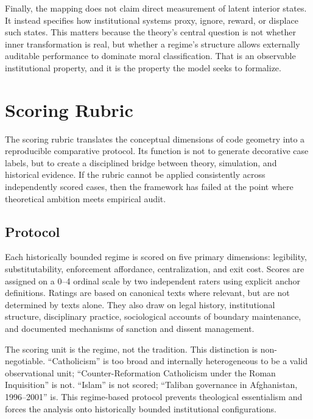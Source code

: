 \documentclass[12pt]{article}
\begin{document}
Finally, the mapping does not claim direct measurement of latent interior states. It instead specifies how institutional systems proxy, ignore, reward, or displace such states. This matters because the theory's central question is not whether inner transformation is real, but whether a regime's structure allows externally auditable performance to dominate moral classification. That is an observable institutional property, and it is the property the model seeks to formalize.



\section{Scoring Rubric}

The scoring rubric translates the conceptual dimensions of code geometry into a reproducible comparative protocol. Its function is not to generate decorative case labels, but to create a disciplined bridge between theory, simulation, and historical evidence. If the rubric cannot be applied consistently across independently scored cases, then the framework has failed at the point where theoretical ambition meets empirical audit.

\subsection{Protocol}

Each historically bounded regime is scored on five primary dimensions: legibility, substitutability, enforcement affordance, centralization, and exit cost. Scores are assigned on a 0--4 ordinal scale by two independent raters using explicit anchor definitions. Ratings are based on canonical texts where relevant, but are not determined by texts alone. They also draw on legal history, institutional structure, disciplinary practice, sociological accounts of boundary maintenance, and documented mechanisms of sanction and dissent management.

The scoring unit is the regime, not the tradition. This distinction is non-negotiable. ``Catholicism'' is too broad and internally heterogeneous to be a valid observational unit; ``Counter-Reformation Catholicism under the Roman Inquisition'' is not. ``Islam'' is not scored; ``Taliban governance in Afghanistan, 1996--2001'' is. This regime-based protocol prevents theological essentialism and forces the analysis onto historically bounded institutional configurations.
\end{document}

